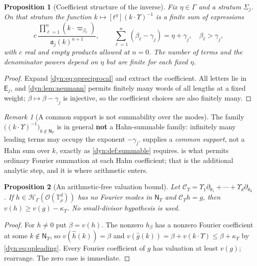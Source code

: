 \documentclass[11pt,letterpaper]{article}
\newtheorem{proposition}[proposition]{Proposition}
\theoremstyle{definition}
\theoremstyle{remark}
\newtheorem{remark}[remark]{Remark}
\newcommand{\HH}{\mathscr H}
\newcommand{\OO}{\mathcal O}
\newcommand{\TT}{\mathbb T}
\newcommand{\strip}{\OO(\TT^{d}_{\rho})}
\newcommand{\Cups}{\mathcal C_{\Upsilon}}
\newcommand{\qlat}{\mathsf N_{\Upsilon}}
\newcommand{\kups}{\kappa_{\Upsilon}}
\newcommand{\fla}{\mathfrak a}
\numberwithin{equation}{section}
\begin{document}
\begin{proposition}[Coefficient structure of the inverse]
\label{dyn:prop:qpjets}
Fix $\eta\in\Gamma$ and a stratum $\Sigma_j$. On that stratum the function
$k\mapsto[t^{\eta}](k\cdot\Upsilon)^{-1}$ is a finite sum of expressions
\begin{equation}\label{dyn:eq:qpmultform}
 c\,\frac{\prod_{\ell=1}^{n}(k\cdot\varpi_{\beta_\ell})}
 {\fla_j(k)^{n+1}},
 \qquad \sum_{\ell=1}^{n}(\beta_\ell-\gamma_j)=\eta+\gamma_j,
 \quad \beta_\ell>\gamma_j,
\end{equation}
with $c$ real and empty products allowed at $n=0$. The number of terms and
the denominator powers depend on $\eta$ but are finite for each fixed
$\eta$.
\end{proposition}
\begin{proof}
Expand \eqref{dyn:eq:qpreciprocal} and extract the coefficient. All letters
lie in $\mathsf E_j$, and \cref{dyn:lem:neumann} permits finitely many
words of all lengths at a fixed weight; $\beta\mapsto\beta-\gamma_j$ is
injective, so the coefficient choices are also finitely many.
\end{proof}

\begin{remark}[A common support is not summability over the modes]
\label{dyn:rem:qpnotsummable}
The family $\bigl((k\cdot\Upsilon)^{-1}\bigr)_{k\notin\qlat}$ is in general
\textbf{not} a Hahn-summable family: infinitely many leading terms may
occupy the exponent $-\gamma_j$.  supplies a
\emph{common support}, not a Hahn sum over $k$, exactly as
\cref{dyn:def:summable} requires.  is what permits
ordinary Fourier summation at each Hahn coefficient; that is the additional
analytic step, and it is where arithmetic enters.
\end{remark}

\begin{proposition}[An arithmetic-free valuation bound]
\label{dyn:prop:qpvalbound}
Let $\Cups=\Upsilon_1\partial_{\theta_1}+\cdots+\Upsilon_d\partial_{\theta_d}$.
If $h\in\HH_\Gamma(\strip)$ has no Fourier modes in $\qlat$ and
$\Cups h=g$, then $v(h)\ge v(g)-\kups$. No small-divisor hypothesis is used.
\end{proposition}
\begin{proof}
For $h\ne0$ put $\beta=v(h)$. The nonzero $h_\beta$ has a nonzero Fourier
coefficient at some $k\notin\qlat$, so $v(\widehat h(k))=\beta$ and
$v(\widehat g(k))=\beta+v(k\cdot\Upsilon)\le\beta+\kups$ by
\eqref{dyn:eq:qpleading}. Every Fourier coefficient of $g$ has valuation at
least $v(g)$; rearrange. The zero case is immediate.
\end{proof}
\end{document}
